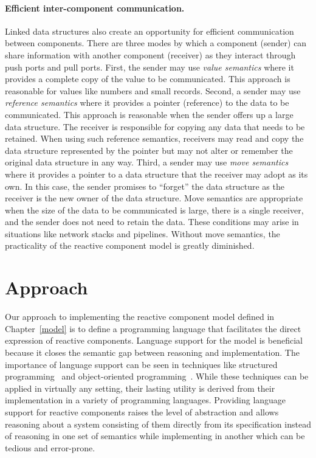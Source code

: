 \paragraph{Efficient inter-component communication.}
Linked data structures also create an opportunity for efficient communication between components.
There are three modes by which a component (sender) can share information with another component (receiver) as they interact through push ports and pull ports.
First, the sender may use \emph{value semantics} where it provides a complete copy of the value to be communicated.
This approach is reasonable for values like numbers and small records.
Second, a sender may use \emph{reference semantics} where it provides a pointer (reference) to the data to be communicated.
This approach is reasonable when the sender offers up a large data structure.
The receiver is responsible for copying any data that needs to be retained.
When using such reference semantics, receivers may read and copy the data structure represented by the pointer but may not alter or remember the original data structure in any way.
Third, a sender may use \emph{move semantics} where it provides a pointer to a data structure that the receiver may adopt as its own.
In this case, the sender promises to ``forget'' the data structure as the receiver is the new owner of the data structure.
Move semantics are appropriate when the size of the data to be communicated is large, there is a single receiver, and the sender does not need to retain the data.
These conditions may arise in situations like network stacks and pipelines.
Without move semantics, the practicality of the reactive component model is greatly diminished.

\section{Approach}

Our approach to implementing the reactive component model defined in Chapter~\ref{model} is to define a programming language that facilitates the direct expression of reactive components.
Language support for the model is beneficial because it closes the semantic gap between reasoning and implementation.
The importance of language support can be seen in techniques like structured programming~\cite{dahl1972structured} and object-oriented programming~\cite{booch1982object}.
While these techniques can be applied in virtually any setting, their lasting utility is derived from their implementation in a variety of programming languages.
Providing language support for reactive components raises the level of abstraction and allows reasoning about a system consisting of them directly from its specification instead of reasoning in one set of semantics while implementing in another which can be tedious and error-prone.

